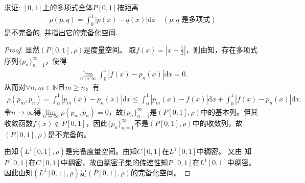 \documentclass[../../main.tex]{subfiles}%
\begin{document}
\begin{example}
求证: $[0,1]$上的多项式全体$P[0,1]$按距离
\begin{align*}
\rho(p,q)=\int_{0}^{1}|p(x)-q(x)|\mathrm{d}x \quad (p,q\text{ 是多项式})
\end{align*}
是不完备的, 并指出它的完备化空间.
\end{example}
\begin{proof}

显然$(P[0,1],\rho)$是度量空间。
取$f(x)=\left|x-\frac{1}{2}\right|$，则由知，存在多项式序列$\{p_n\}_{n=1}^{\infty}$，使得
\begin{align*}
\lim\limits_{n\rightarrow \infty}\int_0^1\left|f(x)-p_n(x)\right|\mathrm{d}x=0.
\end{align*}
从而对$\forall n,m\in\mathbb{N}$且$m\geqslant n$，有
\begin{align*}
\rho (p_m,p_n)=\int_0^1{\left| p_m\left( x \right) -p_n\left( x \right) \right|\mathrm{d}x}\leqslant \int_0^1{\left| p_m\left( x \right) -f\left( x \right) \right|\mathrm{d}x}+\int_0^1{\left| f\left( x \right) -p_n\left( x \right) \right|\mathrm{d}x}.
\end{align*}
令$n\rightarrow \infty$得$\lim\limits_{n\rightarrow \infty}\rho(p_m,p_n)=0$，故$\{p_n\}_{n=1}^{\infty}$是$(P[0,1],\rho)$中的基本列。但其收敛函数$f(x)\notin P[0,1]$，因此$\{p_n\}_{n=1}^{\infty}$不是$(P[0,1],\rho)$中的收敛列，故$(P[0,1],\rho)$是不完备的。

由知$(L^1[0,1],\rho)$是完备度量空间。由知$C[0,1]$在$L^1[0,1]$中稠密。
又由
知$P[0,1]$在$C[0,1]$中稠密，故由\hyperref[proposition:稠密子集的传递性]{稠密子集的传递性}知$P[0,1]$在$L^1[0,1]$中稠密。
因此由知$(L^1[0,1],\rho)$是$(P[0,1],\rho)$的完备化空间。
\end{proof}
\end{document}
